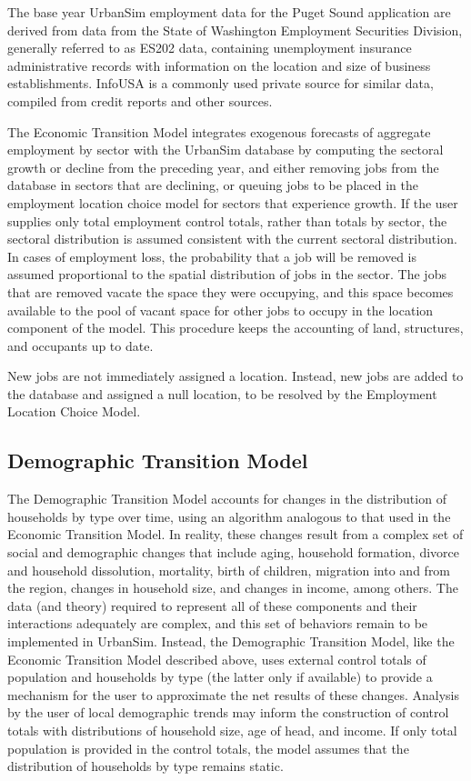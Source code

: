 The base year UrbanSim employment data for the
Puget Sound application are derived from data from the State of Washington
Employment Securities Division, generally referred to
as ES202 data, containing unemployment insurance administrative
records with information on the location and size of business
establishments.  InfoUSA is a commonly used private source for
similar data, compiled from credit reports and other sources.

The Economic Transition Model integrates exogenous forecasts
of aggregate employment by sector with the UrbanSim database by
computing the sectoral growth or decline from the preceding year,
and either removing jobs from the database in sectors that are
declining, or queuing jobs to be placed in the employment location
choice model for sectors that experience growth.  If the user
supplies only total employment control totals, rather than totals
by sector, the sectoral distribution is assumed consistent with
the current sectoral distribution. In cases of employment loss,
the probability that a job will be removed is assumed proportional
to the spatial distribution of jobs in the sector.  The jobs that
are removed vacate the space they were occupying, and this space
becomes available to the pool of vacant space for other jobs to
occupy in the location component of the model.  This procedure
keeps the accounting of land, structures, and occupants up to
date.

New jobs are not immediately assigned a location.  Instead, new
jobs are added to the database and assigned a null location, to be
resolved by the Employment Location Choice Model.


\subsection{Demographic Transition Model}

The Demographic Transition Model accounts for changes in the
distribution of households by type over time, using an algorithm
analogous to that used in the Economic Transition Model.  In
reality, these changes result from a complex set of social and
demographic changes that include aging, household formation,
divorce and household dissolution, mortality, birth of children,
migration into and from the region, changes in household size, and
changes in income, among others.  The data (and theory) required
to represent all of these components and their interactions
adequately are complex, and this set of behaviors remain to be
implemented in UrbanSim. Instead, the Demographic
Transition Model, like the Economic Transition Model described
above, uses external control totals of population and households
by type (the latter only if available) to provide a mechanism for
the user to approximate the net results of these changes. Analysis
by the user of local demographic trends may inform the
construction of control totals with distributions of household
size, age of head, and income.  If only total population is
provided in the control totals, the model assumes that the
distribution of households by type remains static.

